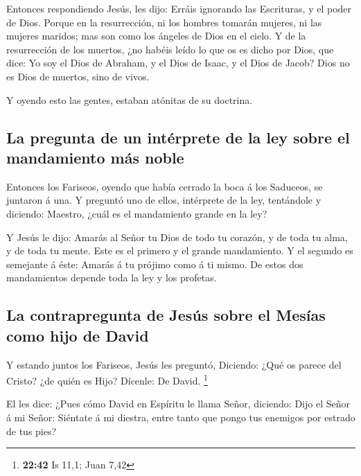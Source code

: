  Entonces respondiendo Jesús, les dijo: Erráis ignorando
las Escrituras, y el poder de Dios.  Porque en la
resurrección, ni los hombres tomarán mujeres, ni las mujeres maridos;
mas son como los ángeles de Dios en el cielo.  Y de la
resurrección de los muertos, ¿no habéis leído lo que os es dicho por
Dios, que dice:  Yo soy el Dios de Abraham, y el Dios de
Isaac, y el Dios de Jacob? Dios no es Dios de muertos, sino de vivos.

 Y oyendo esto las gentes, estaban atónitas de su doctrina.

\hypertarget{la-pregunta-de-un-intuxe9rprete-de-la-ley-sobre-el-mandamiento-muxe1s-noble}{%
\subsection{La pregunta de un intérprete de la ley sobre el mandamiento
más
noble}\label{la-pregunta-de-un-intuxe9rprete-de-la-ley-sobre-el-mandamiento-muxe1s-noble}}

 Entonces los Fariseos, oyendo que había cerrado la boca á
los Saduceos, se juntaron á una.  Y preguntó uno de ellos,
intérprete de la ley, tentándole y diciendo:  Maestro,
¿cuál es el mandamiento grande en la ley?

 Y Jesús le dijo: Amarás al Señor tu Dios de todo tu
corazón, y de toda tu alma, y de toda tu mente.  Este es el
primero y el grande mandamiento.  Y el segundo es semejante
á éste: Amarás á tu prójimo como á ti mismo.  De estos dos
mandamientos depende toda la ley y los profetas.

\hypertarget{la-contrapregunta-de-jesuxfas-sobre-el-mesuxedas-como-hijo-de-david}{%
\subsection{La contrapregunta de Jesús sobre el Mesías como hijo de
David}\label{la-contrapregunta-de-jesuxfas-sobre-el-mesuxedas-como-hijo-de-david}}

 Y estando juntos los Fariseos, Jesús les preguntó,
 Diciendo: ¿Qué os parece del Cristo? ¿de quién es Hijo?
Dícenle: De David. \footnote{\textbf{22:42} Is 11,1; Juan 7,42}

 El les dice: ¿Pues cómo David en Espíritu le llama Señor,
diciendo:  Dijo el Señor á mi Señor: Siéntate á mi diestra,
entre tanto que pongo tus enemigos por estrado de tus pies?

